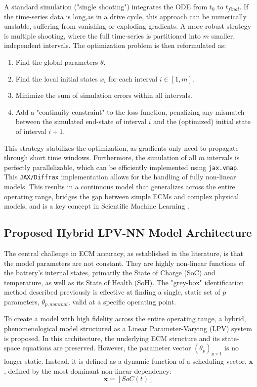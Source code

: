 \documentclass[lettersize,journal]{IEEEtran}
\begin{document}
A standard simulation ("single shooting") integrates the ODE from $t_0$ to $t_{final}$. If the time-series data is long,as in a drive cycle, this approach can be numerically unstable, suffering from vanishing or exploding gradients. A more robust strategy is multiple shooting, where the full time-series is partitioned into $m$ smaller, independent intervals. The optimization problem is then reformulated as:
\begin{enumerate}
	\item Find the global parameters $\theta$.
	\item Find the local initial states $x_i$ for each interval $i \in [1, m]$.
	\item Minimize the sum of simulation errors within all intervals.
	\item Add a "continuity constraint" to the loss function, penalizing any mismatch between the simulated end-state of interval $i$ and the (optimized) initial state of interval $i+1$.
\end{enumerate}

This strategy stabilizes the optimization, as gradients only need to propagate through short time windows. Furthermore, the simulation of all $m$ intervals is perfectly parallelizable, which can be efficiently implemented using \texttt{jax.vmap}. This \texttt{JAX/Diffrax} implementation allows for the handling of fully non-linear models. This results in a continuous model that generalizes across the entire operating range, bridges the gap between simple ECMs and complex physical models, and is a key concept in Scientific Machine Learning \cite{rackauckas2020universal}.

\subsection{Proposed Hybrid LPV-NN Model Architecture}

The central challenge in ECM accuracy, as established in the literature, is that the model parameters are not constant. They are highly non-linear functions of the battery's internal states, primarily the State of Charge (SoC) and temperature, as well as its State of Health (SoH)\cite{tran2021comprehensive, yang2023improved}. The "grey-box" identification method described previously is effective at finding a single, static set of $p$ parameters, $\theta_{p, nominal}$, valid at a specific operating point.

To create a model with high fidelity across the entire operating range, a hybrid, phenomenological model structured as a Linear Parameter-Varying (LPV) system is proposed. In this architecture, the underlying ECM structure and its state-space equations are preserved. However, the parameter vector $(\theta_p)_{p\times 1}$ is no longer static. Instead, it is defined as a dynamic function of a scheduling vector, $\mathbf{x}$, defined by the most dominant non-linear dependency:
\begin{equation}
	\label{eq:scheduling_vector}
	\mathbf{x} = [SoC(t)]
\end{equation}
\end{document}

